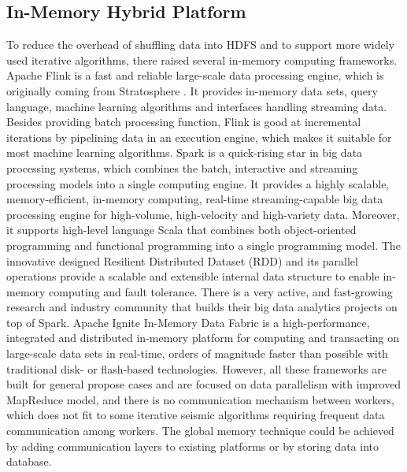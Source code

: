 \subsection{In-Memory Hybrid Platform}
To reduce the overhead of shuffling data into HDFS and to support more widely used iterative algorithms, there raised several in-memory computing frameworks. Apache Flink \cite{ApacheFlink} is a fast and reliable large-scale data processing engine, which is originally coming from Stratosphere \cite{Alexandrov2013Stratosphere}. It provides in-memory data sets, query language, machine learning algorithms and interfaces handling streaming data. Besides providing batch processing function, Flink is good at incremental iterations by pipelining data in an execution engine, which makes it suitable for most machine learning algorithms. 
Spark \cite{ZahariaSCC1863113} is a quick-rising star in big data processing systems, which combines the batch, interactive and streaming \cite{ZahariaDSE2342773} processing models into a single computing engine. It provides a highly scalable, memory-efficient, in-memory computing, real-time streaming-capable big data processing engine for high-volume, high-velocity and high-variety data. Moreover, it supports high-level language Scala that combines both object-oriented programming and functional programming into a single programming model. The innovative designed Resilient Distributed Dataset (RDD) \cite{SparkRDD} and its parallel operations provide a scalable and extensible internal data structure to enable in-memory computing and fault tolerance. There is a very active, and fast-growing research and industry community that builds their big data analytics projects on top of Spark. 
Apache Ignite \cite{ApacheIgnite} In-Memory Data Fabric is a high-performance, integrated and distributed in-memory platform for computing and transacting on large-scale data sets in real-time, orders of magnitude faster than possible with traditional disk- or flash-based technologies. 
However, all these frameworks are built for general propose cases and are focused on data parallelism with improved MapReduce model, and there is no communication mechanism between workers, which does not fit to some iterative seismic algorithms requiring frequent data communication among workers. The global memory technique could be achieved by adding communication layers to existing platforms or by storing data into database. 

